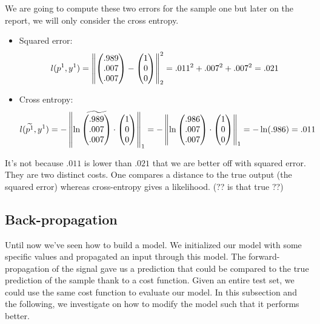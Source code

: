 		\vskip 1cm
		We are going to compute these two errors for the sample one but later on the report, we will only consider the cross entropy.
		\begin{itemize}
			\item Squared error: $$ l(p^1,y^1) =  
									\left\lVert
									\left( \begin{matrix} .989 \\ .007 \\ .007 \end{matrix}\right) - 
									\left( \begin{matrix} 1    \\ 0    \\ 0    \end{matrix}\right) \right\rVert_2^2 = 
									.011^2 + .007^2 + .007^2 = .021 $$
			\item Cross entropy: $$ l(\widetilde{p^1},y^1) = 
									- \left\lVert \ln
								 	\widetilde{\left( \begin{matrix} .989 \\ .007 \\ .007 \end{matrix}\right)} \cdot 
									\left( \begin{matrix} 1    \\ 0    \\ 0    \end{matrix}\right) \right\rVert_1 = 
									- \left\lVert \ln
								 	\left( \begin{matrix} .986 \\ .007 \\ .007 \end{matrix}\right) \cdot 
									\left( \begin{matrix} 1    \\ 0    \\ 0    \end{matrix}\right) \right\rVert_1 = 
									-\ln(.986) = .011
									$$
		\end{itemize}
		It's not because $.011$ is lower than $.021$ that we are better off with squared error. They are two distinct costs. One compares a distance to the true output (the squared error) whereas cross-entropy gives a likelihood. (?? is that true ??)


	\subsection{Back-propagation}
	\label{sec:back_propagation}
		Until now we've seen how to build a model. We initialized our model with some specific values and propagated an input through this model. The forward-propagation of the signal gave us a prediction that could be compared to the true prediction of the sample thank to a cost function. Given an entire test set, we could use the same cost function to evaluate our model. In this subsection and the following, we investigate on how to modify the model such that it performs better.


